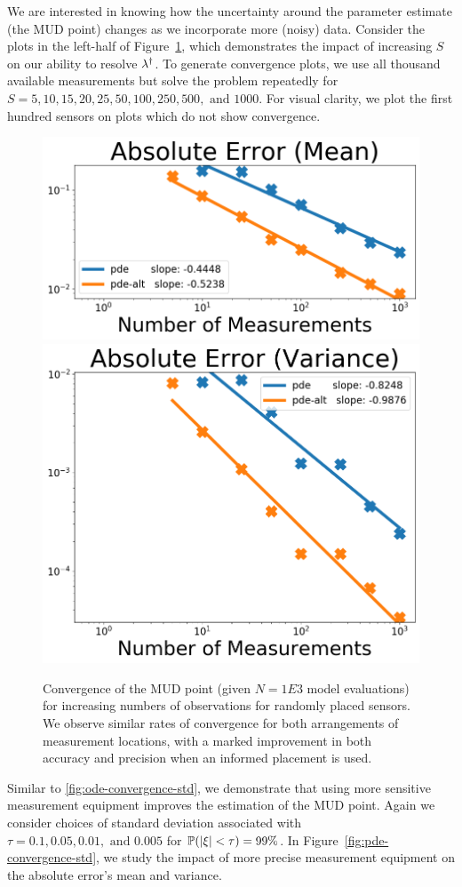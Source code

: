 We are interested in knowing how the uncertainty around the parameter estimate (the MUD point) changes as we incorporate more (noisy) data.
Consider the plots in the left-half of Figure~\ref{fig:pde-convergence-obs}, which demonstrates the impact of increasing $S$ on our ability to resolve $\lambda^\dagger$.
To generate convergence plots, we use all thousand available measurements but solve the problem repeatedly for $S = 5, 10, 15, 20, 25, 50, 100, 250, 500, \text{ and } 1000$.
For visual clarity, we plot the first hundred sensors on plots which do not show convergence.

\begin{figure}
  \centering
  \includegraphics[width=0.475\linewidth]{figures/pde/pde_convergence_mud_obs_mean}
  \includegraphics[width=0.475\linewidth]{figures/pde/pde_convergence_mud_obs_var}
  \caption{Convergence of the MUD point (given $N=1E3$ model evaluations) for increasing numbers of observations for randomly placed sensors.
  We observe similar rates of convergence for both arrangements of measurement locations, with a marked improvement in both accuracy and precision when an informed placement is used.
  }
  \label{fig:pde-convergence-obs}
\end{figure}


Similar to \ref{fig:ode-convergence-std}, we demonstrate that using more sensitive measurement equipment improves the estimation of the MUD point.
Again we consider choices of standard deviation associated with $\tau = 0.1, 0.05, 0.01, \text{ and } 0.005$ for $\mathbb{P}( \left\vert\xi\right\vert < \tau ) = 99\%$.
In Figure~\ref{fig:pde-convergence-std}, we study the impact of more precise measurement equipment on the absolute error's mean and variance.

